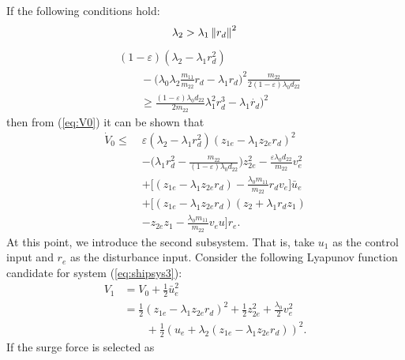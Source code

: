 \documentclass[amsthm, twocolumn]{autart}
\begin{document}
If the following conditions hold:
%
%
\begin{equation}
\lambda_2 > \lambda_1 \left\lVert r_d \right\rVert^2 \\
\label{eq:suffCond_1}
\end{equation}
\begin{equation}
\begin{split} &(1-\varepsilon)(\lambda_2 - \lambda_1 r_d^2) \\
&\qquad - \bigg( \lambda_0 \lambda_2 \frac{m_{11}}{m_{22}} r_d  - \lambda_1 r_d \bigg)^2 \frac{m_{22}}{2(1-\varepsilon) \lambda_0 d_{22}}  \\
&\qquad \geq \frac{(1-\varepsilon) \lambda_0 d_{22}}{2m_{22}}\lambda_1^2 r_d^3 - \lambda_1 \dot{r_d})^2
\end{split}
\label{eq:suffCond_2}
\end{equation}
%
%
then from (\ref{eq:V0}) it can be shown that 
%
%
\begin{equation}
\begin{split}
\dot{V}_0 \leq \; & \varepsilon(\lambda_2 - \lambda_1 r_d^2)(z_{1e}-\lambda_1 z_{2e} r_d )^2  \\
& - \bigg( \lambda_1 r_d^2 - \frac{m_{22}}{(1-\varepsilon) \lambda_0 d_{22}} \bigg) z_{2e}^2 - \frac{\varepsilon \lambda_0 d_{22}}{m_{22}} v_e^2\\
& + \bigg[ (z_{1e} - \lambda_1 z_{2e} r_d ) - \frac{\lambda_0 m_{11}}{m_{22}} r_d v_e \bigg] \bar{u}_e\\
& + \bigg[ (z_{1e} - \lambda_1 z_{2e} r_d )(z_2 + \lambda_1 r_d z_1 )\\
& - z_{2e} z_1 - \frac{\lambda_0 m_{11}}{m_{22}} v_e u \bigg] r_e.
\end{split}
\end{equation}
%
%
At this point, we introduce the second subsystem. That is, take $u_1$ as the control input and $r_e$ as the disturbance input. Consider the following Lyapunov function candidate for system (\ref{eq:shipsys3}):
%
%
\begin{equation}
\begin{aligned}
V_1 & =  V_0 + \frac{1}{2} \bar{u}_e^2  \\
& = \frac{1}{2}(z_{1e} - \lambda_1 z_{2e} r_d)^2 + \frac{1}{2} z_{2e}^2 + \frac{\lambda_0}{2} v_e^2 \\
&\qquad + \frac{1}{2} (u_e+\lambda_2(z_{1e}-\lambda_1 z_{2e} r_d))^2.
\end{aligned}
\label{eq:V1}
\end{equation}
%
%
If the surge force is selected as
%
\end{document}
